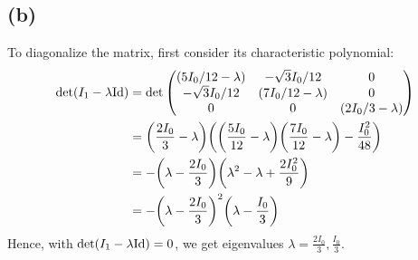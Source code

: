 \documentclass{article}
\newcommand{\Id}{\textmd{Id}} %
\DeclarePairedDelimiter{\paran}{(}{)}%
\begin{document}
\subsection*{(b)}
To diagonalize the matrix, first consider its characteristic polynomial:
\begin{align}
    \det(I_1-\lambda \Id) &= \det\begin{pmatrix}
        (5I_0/12-\lambda)&-\sqrt{3}I_0/12&0\\
        -\sqrt{3}I_0/12&(7I_0/12-\lambda)&0\\
        0&0&(2I_0/3-\lambda) 
    \end{pmatrix}\\
    &= \paran*{\frac{2I_0}{3}-\lambda}\paran*{\paran*{\frac{5I_0}{12}-\lambda}\paran*{\frac{7I_0}{12}-\lambda}-\frac{I_0^2}{48}}\\
    &= -\paran*{\lambda-\frac{2I_0}{3}}\paran*{\lambda^2-\lambda+\frac{2I_0^2}{9}}\\
    &= -\paran*{\lambda-\frac{2I_0}{3}}^2\paran*{\lambda-\frac{I_0}{3}}
\end{align}
Hence, with $\det(I_1-\lambda\Id)=0$, we get eigenvalues $\lambda=\frac{2I_0}{3},\frac{I_0}{3}$.
\end{document}
